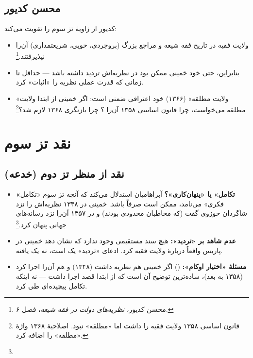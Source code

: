 \subsection{محسن کدیور}

کدیور از زاویهٔ  تز سوم را تقویت می‌کند:

\begin{itemize}[label=\textcolor{cPrimary}{$\blacktriangleright$}, rightmargin=2em]
    \item ولایت فقیه در تاریخ فقه شیعه  و مراجع بزرگ (بروجردی، خویی، شریعتمداری) آن‌را نپذیرفتند.\footnote{محسن کدیور، \textit{نظریه‌های دولت در فقه شیعه}، فصل ۶.}
    \item بنابراین، حتی خود خمینی ممکن بود در  نظریه‌اش تردید داشته باشد — حداقل تا زمانی که قدرت عملی نظریه را «اثبات» کرد.
    \item «ولایت مطلقه» (۱۳۶۶) خود اعترافی ضمنی است: اگر خمینی از ابتدا ولایت مطلقه می‌خواست، چرا قانون اساسی ۱۳۵۸ آن‌را ؟ چرا بازنگری ۱۳۶۸ لازم شد؟\footnote{قانون اساسی ۱۳۵۸ ولایت فقیه را داشت اما «مطلقه» نبود. اصلاحیهٔ ۱۳۶۸ واژهٔ «مطلقه» را اضافه کرد.}
\end{itemize}

\section{نقد تز سوم}

\subsection{نقد از منظر تز دوم (خدعه)}

\begin{itemize}[label=\textcolor{cAccent}{$\times$}, rightmargin=2em]
    \item \textbf{«تکامل» یا «پنهان‌کاری»؟} آبراهامیان استدلال می‌کند که آنچه تز سوم «تکامل فکری» می‌نامد، ممکن است صرفاً  باشد. خمینی در ۱۳۴۸ نظریه‌اش را نزد شاگردان حوزوی گفت (که مخاطبان محدودی بودند) و در ۱۳۵۷ آن‌را نزد رسانه‌های جهانی پنهان کرد.\footnote{}
    \item \textbf{عدم شاهد بر «تردید»:} هیچ سند مستقیمی وجود ندارد که نشان دهد خمینی در پاریس واقعاً دربارهٔ ولایت فقیه  کرد. ادعای «تردید» یک  است، نه یک یافته.
    \item \textbf{مسئلهٔ «اختیار اوکام»:} () اگر خمینی هم نظریه داشت (۱۳۴۸) و هم آن‌را اجرا کرد (۱۳۵۸ به بعد)، ساده‌ترین توضیح آن است که از ابتدا قصد اجرا داشت — نه اینکه تکامل پیچیده‌ای طی کرد.
\end{itemize}

